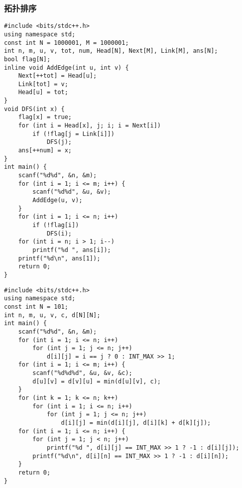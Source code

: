 \documentclass[a4paper]{article}
\begin{document}
\subsubsection{拓扑排序}
\begin{lstlisting}
#include <bits/stdc++.h>
using namespace std;
const int N = 1000001, M = 1000001;
int n, m, u, v, tot, num, Head[N], Next[M], Link[M], ans[N];
bool flag[N];
inline void AddEdge(int u, int v) {
    Next[++tot] = Head[u];
    Link[tot] = v;
    Head[u] = tot;
}
void DFS(int x) {
    flag[x] = true;
    for (int i = Head[x], j; i; i = Next[i])
        if (!flag[j = Link[i]])
            DFS(j);
    ans[++num] = x;
}
int main() {
    scanf("%d%d", &n, &m);
    for (int i = 1; i <= m; i++) {
        scanf("%d%d", &u, &v);
        AddEdge(u, v);
    }
    for (int i = 1; i <= n; i++)
        if (!flag[i])
            DFS(i);
    for (int i = n; i > 1; i--)
        printf("%d ", ans[i]);
    printf("%d\n", ans[1]);
    return 0;
}
\end{lstlisting}
\begin{lstlisting}
#include <bits/stdc++.h>
using namespace std;
const int N = 101;
int n, m, u, v, c, d[N][N];
int main() {
    scanf("%d%d", &n, &m);
    for (int i = 1; i <= n; i++)
        for (int j = 1; j <= n; j++)
            d[i][j] = i == j ? 0 : INT_MAX >> 1;
    for (int i = 1; i <= m; i++) {
        scanf("%d%d%d", &u, &v, &c);
        d[u][v] = d[v][u] = min(d[u][v], c);
    }
    for (int k = 1; k <= n; k++)
        for (int i = 1; i <= n; i++)
            for (int j = 1; j <= n; j++)
                d[i][j] = min(d[i][j], d[i][k] + d[k][j]);
    for (int i = 1; i <= n; i++) {
        for (int j = 1; j < n; j++)
            printf("%d ", d[i][j] == INT_MAX >> 1 ? -1 : d[i][j]);
        printf("%d\n", d[i][n] == INT_MAX >> 1 ? -1 : d[i][n]);
    }
    return 0;
}
\end{lstlisting}
\end{document}
